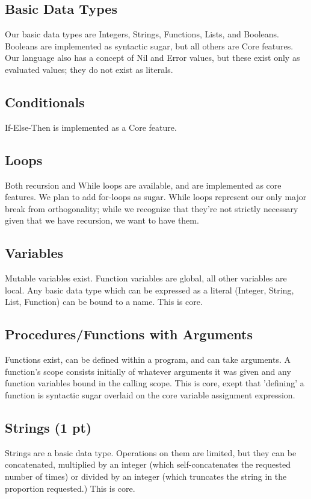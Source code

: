 \documentclass{article}
\begin{document}
\subsection*{Basic Data Types}
Our basic data types are Integers, Strings, Functions, Lists, and Booleans.  Booleans are implemented as syntactic sugar, but all others are Core features.  Our language also has a concept of Nil and Error values, but these exist only as evaluated values; they do not exist as literals.

\subsection*{Conditionals}
If-Else-Then is implemented as a Core feature.

\subsection*{Loops}
Both recursion and While loops are available, and are implemented as core features.  We plan to add for-loops as sugar.  While loops represent our only major break from orthogonality; while we recognize that they're not strictly necessary given that we have recursion, we want to have them.

\subsection*{Variables}
Mutable variables exist.  Function variables are global, all other variables are local.  Any basic data type which can be expressed as a literal (Integer, String, List, Function) can be bound to a name.  This is core.

\subsection*{Procedures/Functions with Arguments}
Functions exist, can be defined within a program, and can take arguments.  A function's scope consists initially of whatever arguments it was given and any function variables bound in the calling scope.  This is core, exept that 'defining' a function is syntactic sugar overlaid on the core variable assignment expression.

\subsection*{Strings (1 pt)}
Strings are a basic data type.  Operations on them are limited, but they can be concatenated, multiplied by an integer (which self-concatenates the requested number of times) or divided by an integer (which truncates the string in the proportion requested.)  This is core.
\end{document}
